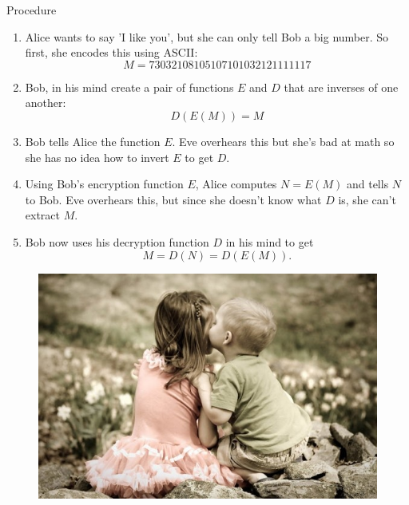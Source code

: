 \documentclass{beamer}
\def\enumb{\begin{enumerate}}
\def\enume{\end{enumerate}}
\begin{document}
\begin{frame}{Procedure}
\enumb
\item Alice wants to say 'I like you', but she can only tell Bob a big number. So first, she encodes this using ASCII:
\[
M=73032108105107101032121111117
\]
\item Bob, in his mind create a pair of functions $E$ and $D$ that are inverses of one another: 
\[
D(E(M))=M
\]
\item Bob tells Alice the function $E$. Eve overhears this but she's bad at math so she has no idea how to invert $E$ to get $D$.
\item Using Bob's encryption function $E$, Alice computes $N=E(M)$ and tells $N$ to Bob. Eve overhears this, but since she doesn't know what $D$ is, she can't extract $M$.
\item Bob now uses his decryption function $D$ in his mind to get 
\[
M=D(N)=D(E(M)).
\]
\enume
\end{frame}

\begin{frame}
\begin{figure}
\centering
\includegraphics[scale=0.5]{kiss}
\end{figure}
\end{frame}
\end{document}

